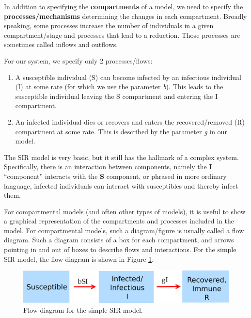 \documentclass[]{book}
\providecommand{\tightlist}{%
  \setlength{\itemsep}{0pt}\setlength{\parskip}{0pt}}
\theoremstyle{definition}
\theoremstyle{definition}
\theoremstyle{definition}
\theoremstyle{remark}
\begin{document}
In addition to specifying the \textbf{compartments} of a model, we need
to specify the \textbf{processes/mechanisms} determining the changes in
each compartment. Broadly speaking, some processes increase the number
of individuals in a given compartment/stage and processes that lead to a
reduction. Those processes are sometimes called inflows and outflows.

For our system, we specify only 2 processes/flows:

\begin{enumerate}
\def\labelenumi{\arabic{enumi}.}
\tightlist
\item
  A susceptible individual (S) can become infected by an infectious
  individual (I) at some rate (for which we use the parameter \emph{b}).
  This leads to the susceptible individual leaving the S compartment and
  entering the I compartment.\\
\item
  An infected individual dies or recovers and enters the
  recovered/removed (R) compartment at some rate. This is described by
  the parameter \emph{g} in our model.
\end{enumerate}

The SIR model is very basic, but it still has the hallmark of a complex
system. Specifically, there is an interaction between components, namely
the \textbf{I} ``component'' interacts with the \textbf{S} component, or
phrased in more ordinary language, infected individuals can interact
with susceptibles and thereby infect them.

For compartmental models (and often other types of models), it is useful
to show a graphical representation of the compartments and processes
included in the model. For compartmental models, such a diagram/figure
is usually called a flow diagram. Such a diagram consists of a box for
each compartment, and arrows pointing in and out of boxes to describe
flows and interactions. For the simple SIR model, the flow diagram is
shown in Figure \ref{fig:basicSIR}.

\begin{figure}
\centering
\includegraphics{./images/basicSIRmodelfigure.png}
\caption{\label{fig:basicSIR}Flow diagram for the simple SIR model.}
\end{figure}
\end{document}
